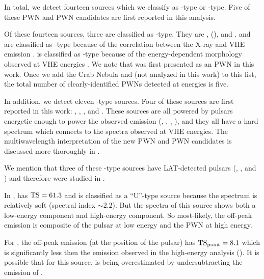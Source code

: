 In total, we detect fourteen sources which we classify as \PWNClass-type
or \PWNcClass-type. Five of these \ac{PWN} and \ac{PWN} candidates are
first reported in this analysis.

Of these fourteen sources, three are classified as \PWNClass-type.  They
are , \mshfifteenfiftytwo (), and .
 and \mshfifteenfiftytwo are classified as \PWNClass-type
because of the correlation between the X-ray and \ac{VHE} emission
\citep{h.e.s.s.collaboration_2011a_discovery-source,aharonian_2005a_discovery-extended}.
 is classified as \PWNClass-type because of
the energy-dependent morphology observed at \ac{VHE} energies
\citep{aharonian_2006a_energy-dependent}.  We note that 
was first presented as an \ac{PWN} in this work.  Once we add the Crab
Nebula and \velax (not analyzed in this work) to this list, the total
number of clearly-identified \acp{PWN} detected at \gev energies is five.

In addition, we detect eleven \PWNcClass-type sources.  Four of these
sources are first reported in this work: , ,
, and .  These sources are all powered by
pulsars energetic enough to power the observed emission (,
, , ), and they all have a hard
spectrum which connects to the spectra observed at \ac{VHE} energies.  The
multiwavelength interpretation of the new \ac{PWN} and \ac{PWN} candidates
is discussed more thoroughly in \cite{acero_2013a_constraints-galactic}.

We mention that three of these \PWNcClass-type sources have LAT-detected
pulsars (, , and ) and therefore were
studied in .

In ,  has $\mathrm{TS}=61.3$ and is classified as a
``U''-type source because the spectrum is relatively soft (spectral index
$\sim2.2$).  But the spectra of this source shows both a low-energy
component and high-energy component.  So most-likely, the off-peak
emission is composite of the pulsar at low energy and the \ac{PWN}
at high energy.

For , the off-peak emission (at the position of the pulsar)
has $\mathrm{TS}_\mathrm{point}=8.1$ which is significantly less then the emission observed
in the high-energy analysis ().  It is possible that for this
source, \tstev is being overestimated by undersubtracting the emission
of .

